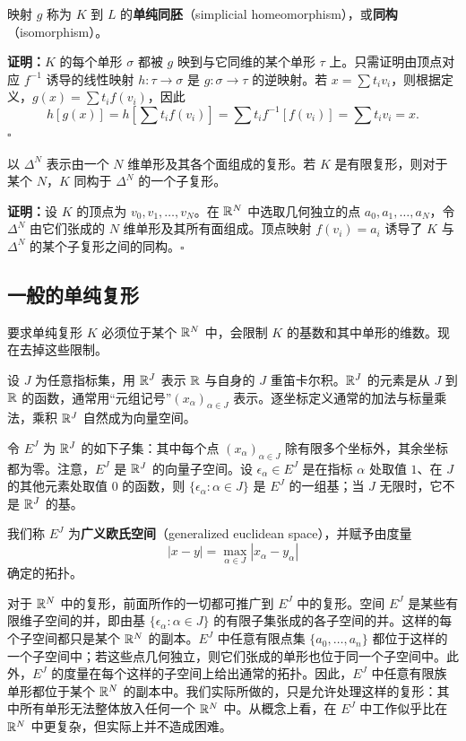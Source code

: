 映射 $g$ 称为 $K$ 到 $L$ 的\textbf{单纯同胚}（simplicial homeomorphism），或\textbf{同构}（isomorphism）。

\noindent\textbf{证明：}$K$ 的每个单形 $\sigma$ 都被 $g$ 映到与它同维的某个单形 $\tau$ 上。只需证明由顶点对应 $f^{-1}$ 诱导的线性映射 $h:\tau\to\sigma$ 是 $g:\sigma\to\tau$ 的逆映射。若 $x=\sum t_i v_i$，则根据定义，$g(x)=\sum t_i f(v_i)$，因此
\[
h[g(x)]=h\left[\sum t_i f(v_i)\right]
=\sum t_i f^{-1}[f(v_i)]=\sum t_i v_i=x.
\]\hfill$\square$

以 $\Delta^N$ 表示由一个 $N$ 维单形及其各个面组成的复形。若 $K$ 是有限复形，则对于某个 $N$，$K$ 同构于 $\Delta^N$ 的一个子复形。

\noindent\textbf{证明：}设 $K$ 的顶点为 $v_0,v_1,\ldots,v_N$。在 $\mathbb{R}^N$ 中选取几何独立的点 $a_0,a_1,\ldots,a_N$，令 $\Delta^N$ 由它们张成的 $N$ 维单形及其所有面组成。顶点映射 $f(v_i)=a_i$ 诱导了 $K$ 与 $\Delta^N$ 的某个子复形之间的同构。\hfill$\square$

\subsection*{一般的单纯复形}
要求单纯复形 $K$ 必须位于某个 $\mathbb{R}^N$ 中，会限制 $K$ 的基数和其中单形的维数。现在去掉这些限制。

设 $J$ 为任意指标集，用 $\mathbb{R}^J$ 表示 $\mathbb{R}$ 与自身的 $J$ 重笛卡尔积。$\mathbb{R}^J$ 的元素是从 $J$ 到 $\mathbb{R}$ 的函数，通常用“元组记号”$(x_\alpha)_{\alpha\in J}$ 表示。逐坐标定义通常的加法与标量乘法，乘积 $\mathbb{R}^J$ 自然成为向量空间。

令 $E^J$ 为 $\mathbb{R}^J$ 的如下子集：其中每个点 $(x_\alpha)_{\alpha\in J}$ 除有限多个坐标外，其余坐标都为零。注意，$E^J$ 是 $\mathbb{R}^J$ 的向量子空间。设 $\epsilon_\alpha\in E^J$ 是在指标 $\alpha$ 处取值 $1$、在 $J$ 的其他元素处取值 $0$ 的函数，则 $\{\epsilon_\alpha:\alpha\in J\}$ 是 $E^J$ 的一组基；当 $J$ 无限时，它不是 $\mathbb{R}^J$ 的基。

我们称 $E^J$ 为\textbf{广义欧氏空间}（generalized euclidean space），并赋予由度量
\[
|x-y|=\max_{\alpha\in J}|x_\alpha-y_\alpha|
\]
确定的拓扑。

对于 $\mathbb{R}^N$ 中的复形，前面所作的一切都可推广到 $E^J$ 中的复形。空间 $E^J$ 是某些有限维子空间的并，即由基 $\{\epsilon_\alpha:\alpha\in J\}$ 的有限子集张成的各子空间的并。这样的每个子空间都只是某个 $\mathbb{R}^N$ 的副本。$E^J$ 中任意有限点集 $\{a_0,\ldots,a_n\}$ 都位于这样的一个子空间中；若这些点几何独立，则它们张成的单形也位于同一个子空间中。此外，$E^J$ 的度量在每个这样的子空间上给出通常的拓扑。因此，$E^J$ 中任意有限族单形都位于某个 $\mathbb{R}^N$ 的副本中。我们实际所做的，只是允许处理这样的复形：其中所有单形无法整体放入任何一个 $\mathbb{R}^N$ 中。从概念上看，在 $E^J$ 中工作似乎比在 $\mathbb{R}^N$ 中更复杂，但实际上并不造成困难。

